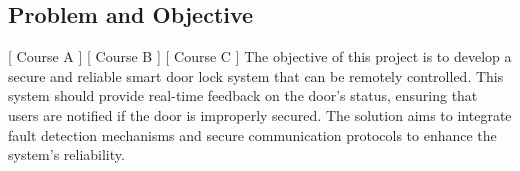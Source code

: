 \subsection{Problem and Objective}
[ Course A ] [ Course B ] [ Course C ]
\newline
The objective of this project is to develop a secure and reliable smart door lock system that can be remotely controlled. This system should provide real-time feedback on the door's status, ensuring that users are notified if the door is improperly secured. The solution aims to integrate fault detection mechanisms and secure communication protocols to enhance the system's reliability.
